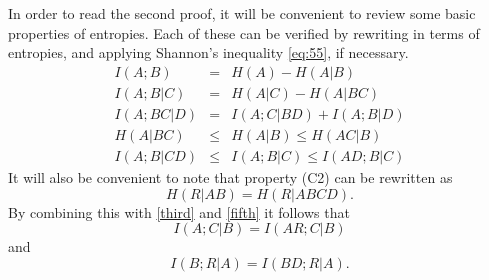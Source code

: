 \documentclass[10pt,journal]{IEEEtran}
\begin{document}
In order to read the second proof, it will be convenient to review some basic properties of
entropies.  Each of these can be verified by rewriting in terms of entropies, and applying Shannon's
inequality \eqref{eq:55}, if necessary.
\begin{eqnarray}
I(A;B) &=& H(A)-H(A|B)\label{first}\\
I(A;B|C)&=& H(A|C)-H(A|BC)\label{second}\\
I(A;BC|D) &=& I(A;C|BD)+ I(A;B|D)\label{third}\\
H(A|BC) &\leq& H(A|B) \leq H(AC|B)\label{fourth}\\
I(A;B|CD) &\leq& I(A;B|C)\leq I(AD;B|C)\label{fifth}
\end{eqnarray}
It will also be convenient to note that property (C2) can be rewritten as
\begin{equation}\label{C2A}
H(R|AB)=H(R|ABCD).
\end{equation}
By combining this with \eqref{third} and \eqref{fifth} it follows that
\begin{equation}
I(A;C|B)=I(AR;C|B)\label{C2B}
\end{equation}
and
\begin{equation}\label{C2C}
I(B;R|A)=I(BD;R|A).
\end{equation}
\end{document}
